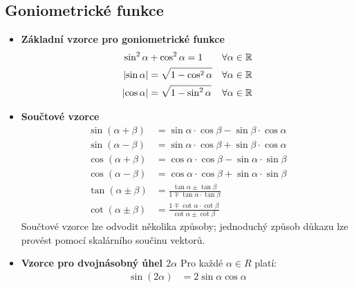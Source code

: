 \subsection{Goniometrické funkce}  
    \begin{itemize}
      \item \textbf{Základní vzorce pro goniometrické funkce}
        \begin{align}
          \sin^2\alpha     &+ \cos^2\alpha = 1      &\forall\alpha\in\mathbb{R} \label{MA1:eq_sincos} \\ 
          \left\lvert\sin\alpha\right\rvert &= \sqrt{1-\cos^2\alpha} &\forall\alpha\in\mathbb{R} \label{MA1:eq_sinabs} \\ 
          \left\lvert\cos\alpha\right\rvert &= \sqrt{1-\sin^2\alpha} &\forall\alpha\in\mathbb{R} \label{MA1:eq_cosabs}
        \end{align}  
      \item \textbf{Součtové vzorce}
        \begin{align}
          \sin(\alpha + \beta) 
            &= \sin\alpha\cdot\cos\beta 
             - \sin\beta\cdot\cos\alpha           \label{MA1:eq_sinxpy}  \\ 
          \sin(\alpha - \beta) 
            &= \sin\alpha\cdot\cos\beta 
             + \sin\beta\cdot\cos\alpha           \label{MA1:eq_sinxmy}  \\ 
          \cos(\alpha + \beta) 
            &= \cos\alpha\cdot\cos\beta 
             - \sin\alpha\cdot\sin\beta           \label{MA1:eq_cosxpy}  \\ 
          \cos(\alpha - \beta) 
            &= \cos\alpha\cdot\cos\beta 
             + \sin\alpha\cdot\sin\beta           \label{MA1:eq_cosxmy}  \\ 
          \tan(\alpha\pm\beta) 
            &= \frac{\tan\alpha\pm\tan\beta}{1\mp\tan\alpha\cdot\tan\beta} \label{MA1:eq_tanxpmy}\\ 
          \cot(\alpha\pm\beta) 
            &= \frac{1\mp\cot\alpha\cdot\cot\beta}{\cot\alpha\pm \cot\beta} \label{MA1:eq_cotxpmy}
        \end{align}
        Součtové vzorce lze odvodit několika způsoby; jednoduchý způsob důkazu
        lze provést pomocí skalárního součinu vektorů.
      \item \textbf{Vzorce pro dvojnásobný úhel $2\alpha$}
        \newline Pro každé $\alpha\in R$ platí:
        \begin{align}
          \sin(2\alpha)   &= 2\sin\alpha\cos\alpha                \label{MA1:eq_sin2x} \\ 

\end{align}
\end{itemize}
